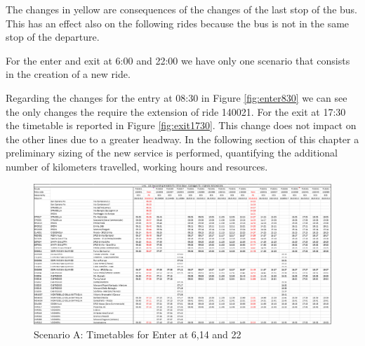 The changes in yellow are consequences of the changes of the last stop of the bus. This has an effect also on the following rides because the bus is not in the same stop of the departure.

For the enter and exit at 6:00 and 22:00 we have only one scenario that consists in the creation of a new ride.

Regarding the changes for the entry at 08:30 in Figure \ref{fig:enter830} we can see the only changes the require the extension of ride 140021. For the exit at 17:30 the timetable is reported in Figure \ref{fig:exit1730}. This change does not impact on the other lines due to a greater headway. In the following section of this chapter a preliminary sizing of the new service is performed, quantifying the additional number of kilometers travelled, working hours and resources.

\newpage
\thispagestyle{empty}
\begin{landscape}
\begin{figure}[h]
    \centering
    \includegraphics[width=1.4\textwidth]{Images/Scheduling/timetables/Scenario_A.png}
    \caption{Scenario A: Timetables for Enter at 6,14 and 22}
    \label{fig:A1}
\end{figure}
\end{landscape}


